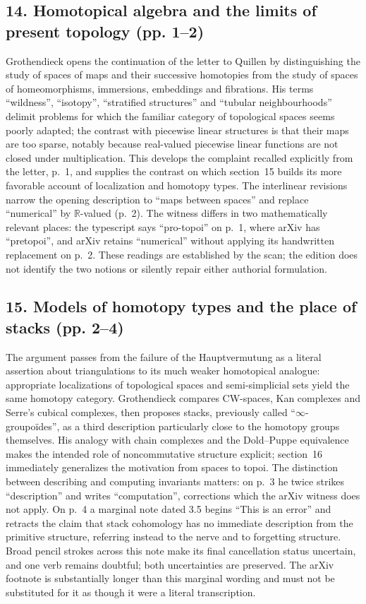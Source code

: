 \documentclass[10pt,oneside]{book}
\begin{document}
\subsection*{14. Homotopical algebra and the limits of present topology (pp. 1--2)}
Grothendieck opens the continuation of the letter to Quillen by distinguishing the study of spaces of maps and their successive homotopies from the study of spaces of homeomorphisms, immersions, embeddings and fibrations. His terms ``wildness'', ``isotopy'', ``stratified structures'' and ``tubular neighbourhoods'' delimit problems for which the familiar category of topological spaces seems poorly adapted; the contrast with piecewise linear structures is that their maps are too sparse, notably because real-valued piecewise linear functions are not closed under multiplication. This develops the complaint recalled explicitly from the letter, p.~1, and supplies the contrast on which section~15 builds its more favorable account of localization and homotopy types. The interlinear revisions narrow the opening description to ``maps between spaces'' and replace ``numerical'' by $\mathbb R$-valued (p.~2). The witness differs in two mathematically relevant places: the typescript says ``pro-topoi'' on p.~1, where arXiv has ``pretopoi'', and arXiv retains ``numerical'' without applying its handwritten replacement on p.~2. These readings are established by the scan; the edition does not identify the two notions or silently repair either authorial formulation.

\subsection*{15. Models of homotopy types and the place of stacks (pp. 2--4)}
The argument passes from the failure of the Hauptvermutung as a literal assertion about triangulations to its much weaker homotopical analogue: appropriate localizations of topological spaces and semi-simplicial sets yield the same homotopy category. Grothendieck compares CW-spaces, Kan complexes and Serre's cubical complexes, then proposes stacks, previously called ``$\infty$-groupoïdes'', as a third description particularly close to the homotopy groups themselves. His analogy with chain complexes and the Dold--Puppe equivalence makes the intended role of noncommutative structure explicit; section~16 immediately generalizes the motivation from spaces to topoi. The distinction between describing and computing invariants matters: on p.~3 he twice strikes ``description'' and writes ``computation'', corrections which the arXiv witness does not apply. On p.~4 a marginal note dated 3.5 begins ``This is an error'' and retracts the claim that stack cohomology has no immediate description from the primitive structure, referring instead to the nerve and to forgetting structure. Broad pencil strokes across this note make its final cancellation status uncertain, and one verb remains doubtful; both uncertainties are preserved. The arXiv footnote is substantially longer than this marginal wording and must not be substituted for it as though it were a literal transcription.
\end{document}

